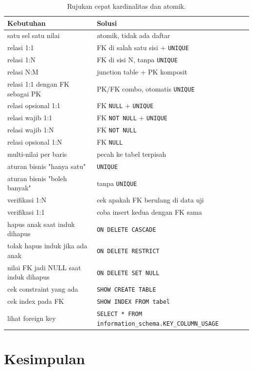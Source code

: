\documentclass[11pt,a4paper]{article}
\begin{document}
\begin{table}[H]
	\centering
	\caption{Rujukan cepat kardinalitas dan atomik.}
	\label{tab:cheat}
	\footnotesize
	\begin{tabularx}{\textwidth}{l X}
		\toprule
		Kebutuhan & Solusi \\
		\midrule
		satu sel satu nilai & atomik, tidak ada daftar \\
		relasi 1:1 & FK di salah satu sisi + \texttt{UNIQUE} \\
		relasi 1:N & FK di sisi N, tanpa \texttt{UNIQUE} \\
		relasi N:M & junction table + PK komposit \\
		relasi 1:1 dengan FK sebagai PK & PK/FK combo, otomatis \texttt{UNIQUE} \\
		relasi opsional 1:1 & FK \texttt{NULL} + \texttt{UNIQUE} \\
		relasi wajib 1:1 & FK \texttt{NOT NULL} + \texttt{UNIQUE} \\
		relasi wajib 1:N & FK \texttt{NOT NULL} \\
		relasi opsional 1:N & FK \texttt{NULL} \\
		multi-nilai per baris & pecah ke tabel terpisah \\
		aturan bisnis "hanya satu" & \texttt{UNIQUE} \\
		aturan bisnis "boleh banyak" & tanpa \texttt{UNIQUE} \\
		verifikasi 1:N & cek apakah FK berulang di data uji \\
		verifikasi 1:1 & coba insert kedua dengan FK sama \\
		hapus anak saat induk dihapus & \texttt{ON DELETE CASCADE} \\
		tolak hapus induk jika ada anak & \texttt{ON DELETE RESTRICT} \\
		nilai FK jadi NULL saat induk dihapus & \texttt{ON DELETE SET NULL} \\
		cek constraint yang ada & \texttt{SHOW CREATE TABLE} \\
		cek index pada FK & \texttt{SHOW INDEX FROM tabel} \\
		lihat foreign key & \texttt{SELECT * FROM information\_schema.KEY\_COLUMN\_USAGE} \\
		\bottomrule
	\end{tabularx}
\end{table}

\section{Kesimpulan}
\end{document}
